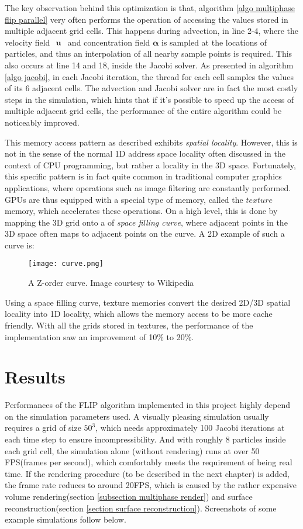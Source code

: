 The key observation behind this optimization is that, algorithm \ref{algo multiphase flip parallel} very often performs the operation of accessing the values stored in multiple adjacent grid cells. This happens during advection, in line 2-4, where the velocity field $\textbf{ \textbf{u} }$ and concentration field $\bm{\alpha}$ is sampled at the locations of particles, and thus an interpolation of all nearby sample points is required. This also occurs at line 14 and 18, inside the Jacobi solver. As presented in algorithm \ref{algo jacobi}, in each Jacobi iteration, the thread for each cell samples the values of its 6 adjacent cells. The advection and Jacobi solver are in fact the most costly steps in the simulation, which hints that if it's possible to speed up the access of multiple adjacent grid cells, the performance of the entire algorithm could be noticeably improved.

This memory access pattern as described exhibits \textit{spatial locality}. However, this is not in the sense of the normal 1D address space locality often discussed in the context of CPU programming, but rather a locality in the 3D space. Fortunately, this specific pattern is in fact quite common in traditional computer graphics applications, where operations such as image filtering are constantly performed. GPUs are thus equipped with a special type of memory, called the $texture$ memory, which accelerates these operations. On a high level, this is done by mapping the 3D grid onto a of \textit{space filling curve}, where adjacent points in the 3D space often maps to adjacent points on the curve. A 2D example of such a curve is:

\begin{figure}[H]
    \centering
        \texttt{[image: curve.png]}
    \caption{A Z-order curve. Image courtesy to Wikipedia}
    \label{}
\end{figure}

Using a space filling curve, texture memories convert the desired 2D/3D spatial locality into 1D locality, which allows the memory access to be more cache friendly. With all the grids stored in textures, the performance of the implementation saw an improvement of 10\% to 20\%.

\section{Results}
Performances of the FLIP algorithm implemented in this project highly depend on the simulation parameters used. A visually pleasing simulation usually requires a grid of size $50^3$, which needs approximately 100 Jacobi iterations at each time step to ensure incompressibility. And with roughly 8 particles inside each grid cell, the simulation alone (without rendering) runs at over 50 FPS(frames per second), which comfortably meets the requirement of being real time. If the rendering procedure (to be described in the next chapter) is added, the frame rate reduces to around 20FPS, which is caused by the rather expensive volume rendering(section \ref{subsection multiphase render}) and surface reconstruction(section \ref{section surface reconstruction}). Screenshots of some example simulations follow below.



